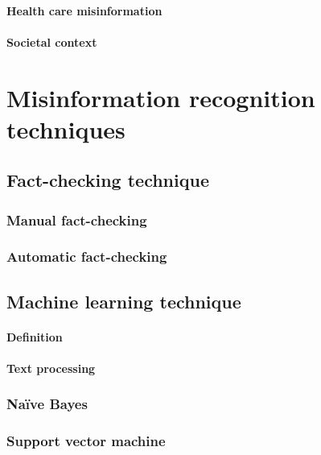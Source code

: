 \documentclass[11pt ,english,a4paper]{article}
\begin{document}
\paragraph{Health care misinformation}
\paragraph{Societal context}


\section{Misinformation recognition techniques} \label{tech}

\subsection{Fact-checking technique} \label{tech:fact}

\subsubsection{Manual fact-checking}\label{tech:fact:man}

\subsubsection{Automatic fact-checking}\label{tech:fact:auto}

\subsection{Machine learning technique} \label{tech:mach}

\paragraph{Definition}

\paragraph{Text processing}

\subsubsection{Naïve Bayes}

\subsubsection{Support vector machine}
\end{document}
